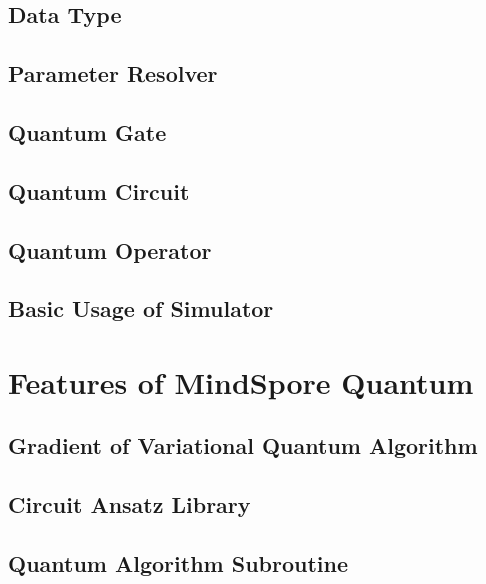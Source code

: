 \documentclass[pra,twocolumn,superscriptaddress,floatfix,nofootinbib,amsmath,amssymb]{revtex4-1}
\begin{document}
\subsection{Data Type}


\subsection{Parameter Resolver}


\subsection{Quantum Gate}


\subsection{Quantum Circuit}


\subsection{Quantum Operator}


\subsection{Basic Usage of Simulator}
\label{sec:sim_basic_usage}



\section{Features of MindSpore Quantum}

\subsection{Gradient of Variational Quantum Algorithm}


\subsection{Circuit Ansatz Library}


\subsection{Quantum Algorithm Subroutine}

\end{document}
